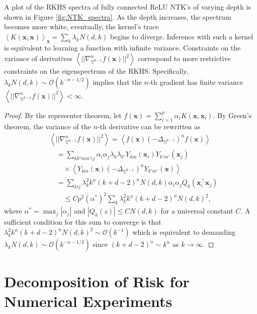 \documentclass{article}
\begin{document}
A plot of the RKHS spectra of fully connected ReLU NTK's of varying depth is shown in Figure \ref{fig:NTK_spectra}. As the depth increases, the spectrum becomes more white, eventually, the kernel's trace $\left< K(\mathbf{x},\mathbf{x})\right>_{\mathbf{x}} = \sum_k \lambda_k N(d,k)$ begins to diverge. Inference with such a kernel is equivalent to learning a function with infinite variance. Constraints on the variance of derivatives $\left< ||\nabla^n_{\mathbb{S}^{d-1}} f(\mathbf{x})||^2 \right>$ correspond to more restrictive constraints on the eigenspectrum of the RKHS. Specifically, $\lambda_k N(d,k) \sim \mathcal{O}( k^{-n-1/2} )$ implies that the $n$-th gradient has finite variance $\left< ||\nabla^n_{\mathbb{S}^{d-1}} f(\mathbf{x})||^2 \right> < \infty$.
\begin{proof}
By the representer theorem, let $f(\mathbf{x}) = \sum_{i=1}^p \alpha_i K(\mathbf{x},\mathbf{x}_i)$. 
By Green's theorem, the variance of the $n$-th derivative can be rewritten as
\begin{align}
\nonumber
   & \left< ||\nabla^n_{\mathbb{S}^{d-1}} f(\mathbf{x})||^2 \right> = \left< f(\mathbf{x}) (- \Delta_{\mathbb{S}^{d-1}})^n f(\mathbf{x})\right>
    \\
    \nonumber
    &\quad= \sum_{k k' m m' ij} \alpha_i \alpha_j \lambda_k \lambda_{k'} Y_{km}(\mathbf{x}_i) Y_{k'm'}(\mathbf{x}_j) 
    \\
    \nonumber
    &\qquad\times \left< Y_{km}(\mathbf{x}) (- \Delta_{\mathbb{S}^{d-1}})^n Y_{k'm'}(\mathbf{x}) \right>
    \\
    \nonumber
    &\quad= \sum_{k i j} \lambda_k^2 k^n(k+d-2)^n N(d,k) \alpha_i \alpha_j Q_{k}(\mathbf{x}_i^\top \mathbf{x}_j) 
    \\
    &\qquad\leq C p^2 (\alpha^*)^2 \sum_{k} \lambda_k^2 k^n(k+d-2)^n N(d,k)^2,
\end{align}
where $\alpha^* = \max_{j} |\alpha_j|$ and $|Q_{k}(z)| \leq C N(d,k)$ for a universal constant $C$. A sufficient condition for this sum to converge is that $\lambda_k^2 k^n(k+d-2)^n N(d,k)^2 \sim \mathcal{O}(k^{-1})$ which is equivalent to demanding $\lambda_k N(d,k) \sim \mathcal{O}(k^{-n-1/2})$ since $(k+d-2)^n \sim k^n$ as $k \to \infty$.
\end{proof}



\section{Decomposition of Risk for Numerical Experiments}
\end{document}
